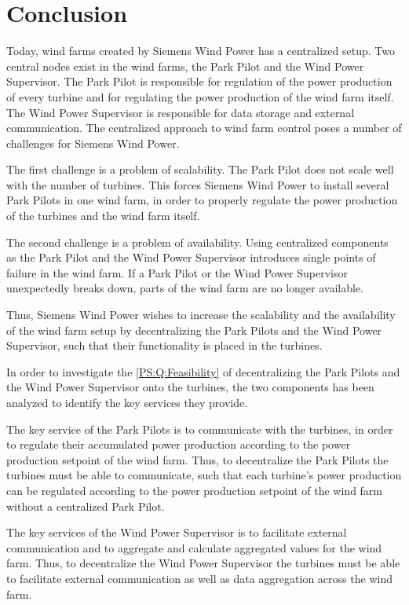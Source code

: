\chapter{Conclusion}
Today, wind farms created by Siemens Wind Power has a centralized setup. Two central nodes exist in the wind farms, the Park Pilot and the Wind Power Supervisor. The Park Pilot is responsible for regulation of the power production of every turbine and for regulating the power production of the wind farm itself. The Wind Power Supervisor is responsible for data storage and external communication. The centralized approach to wind farm control poses a number of challenges for Siemens Wind Power.

The first challenge is a problem of scalability. The Park Pilot does not scale well with the number of turbines. This forces Siemens Wind Power to install several Park Pilots in one wind farm, in order to properly regulate the power production of the turbines and the wind farm itself.

The second challenge is a problem of availability. Using centralized components as the Park Pilot and the Wind Power Supervisor introduces single points of failure in the wind farm. If a Park Pilot or the Wind Power Supervisor unexpectedly breaks down, parts of the wind farm are no longer available.

Thus, Siemens Wind Power wishes to increase the scalability and the availability of the wind farm setup by decentralizing the Park Pilots and the Wind Power Supervisor, such that their functionality is placed in the turbines.

In order to investigate the \ref{PS:Q:Feasibility} of decentralizing the Park Pilots and the Wind Power Supervisor onto the turbines, the two components has been analyzed to identify the key services they provide.

The key service of the Park Pilots is to communicate with the turbines, in order to regulate their accumulated power production according to the power production setpoint of the wind farm. Thus, to decentralize the Park Pilots the turbines must be able to communicate, such that each turbine's power production can be regulated according to the power production setpoint of the wind farm without a centralized Park Pilot.

The key services of the Wind Power Supervisor is to facilitate external communication and to aggregate and calculate aggregated values for the wind farm. Thus, to decentralize the Wind Power Supervisor the turbines must be able to facilitate external communication as well as data aggregation across the wind farm.

